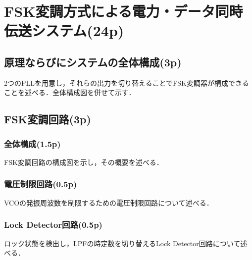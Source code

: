 \documentclass{jsarticle}
\begin{document}
\begin{comment}
\subsection{実装ならびに実験(6p)}
\subsubsection{実装回路(1p)}
実装した回路の写真を示し，実装時に留意した点を述べる．

\subsubsection{実験構成・実験方法(2p)}
実験系の構成図を示し，実験方法を述べる．

\subsubsection{実験結果(3p)}
実験結果とその考察を述べる．
\end{comment}

\section{FSK変調方式による電力・データ同時伝送システム(24p)}
\subsection{原理ならびにシステムの全体構成(3p)}
2つのPLLを用意し，それらの出力を切り替えることでFSK変調器が構成できることを述べる．全体構成図を併せて示す．

\subsection{FSK変調回路(3p)}
\subsubsection{全体構成(1.5p)}
FSK変調回路の構成図を示し，その概要を述べる．
\subsubsection{電圧制限回路(0.5p)}
VCOの発振周波数を制限するための電圧制限回路について述べる．
\subsubsection{Lock Detector回路(0.5p)}
ロック状態を検出し，LPFの時定数を切り替えるLock Detector回路について述べる．
\end{document}
